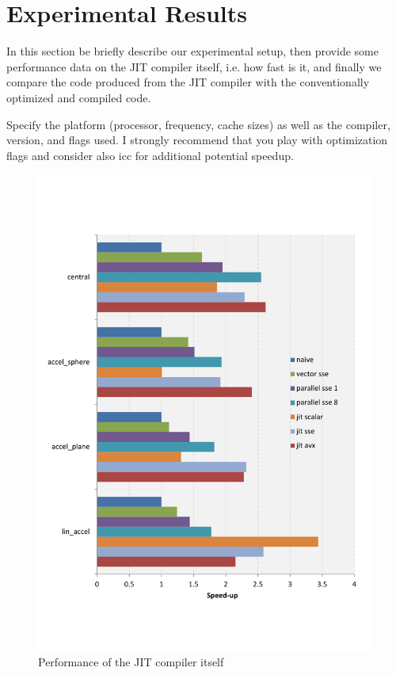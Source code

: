 \section{Experimental Results}\label{sec:exp}

In this section be briefly describe our experimental setup, then provide some performance data on the JIT compiler itself, i.e. how fast is it, and finally we compare the code produced from the JIT compiler with the conventionally optimized and compiled code. 


Specify the platform (processor, frequency, cache sizes)
as well as the compiler, version, and flags used. I strongly recommend that you play with optimization flags and consider also icc for additional potential speedup.



\begin{figure}\centering
  \includegraphics[scale=0.6]{single_dual_rules.pdf}
  \caption{Performance of the JIT compiler itself
  \label{perf_jit}}
\end{figure}

